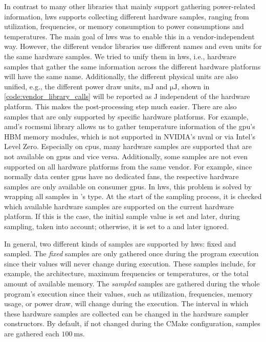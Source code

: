 In contrast to many other libraries that mainly support gathering power-related information, hws supports collecting different hardware samples, ranging from utilization, frequencies, or memory consumption to power consumptions and temperatures. 
The main goal of hws was to enable this in a vendor-independent way. 
However, the different vendor libraries use different names and even units for the same hardware samples. 
We tried to unify them in hws, i.e., hardware samples that gather the same information across the different hardware platforms will have the same name. 
Additionally, the different physical units are also unified, e.g., the different power draw units, $\si{\milli\joule}$ and $\si{\micro\joule}$, shown in \autoref{code:vendor_library_calls} will be reported as $\si{\joule}$ independent of the hardware platform. 
This makes the post-processing step much easier. 
There are also samples that are only supported by specific hardware platforms. 
For example, \gls{amd}'s \gls{rocmsmi} library allows us to gather temperature information of the \gls{gpu}'s HBM memory modules, which is not supported in NVIDIA's \gls{nvml} or via Intel's Level Zero. 
Especially on \glspl{cpu}, many hardware samples are supported that are not available on \glspl{gpu} and vice versa. 
Additionally, some samples are not even supported on all hardware platforms from the same vendor. 
For example, since normally data center \glspl{gpu} have no dedicated fans, the respective hardware samples are only available on consumer \glspl{gpu}. 
In hws, this problem is solved by wrapping all samples in \cpp's  type. 
At the start of the sampling process, it is checked which available hardware samples are supported on the current hardware platform. 
If this is the case, the initial sample value is set and later, during sampling, taken into account; otherwise, it is set to a  and later ignored. 


In general, two different kinds of samples are supported by hws: fixed and sampled. 
The \textit{fixed} samples are only gathered once during the program execution since their values will never change during execution. 
These samples include, for example, the architecture, maximum frequencies or temperatures, or the total amount of available memory. 
The \textit{sampled} samples are gathered during the whole program's execution since their values, such as utilization, frequencies, memory usage, or power draw, will change during the execution.  
The interval in which these hardware samples are collected can be changed in the hardware sampler constructors. 
By default, if not changed during the CMake configuration, samples are gathered each $\SI{100}{\milli\second}$. 

